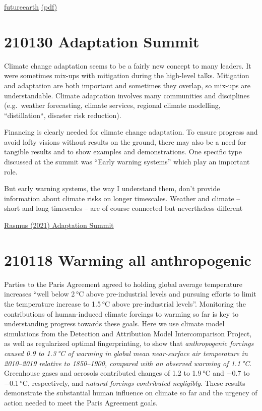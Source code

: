 \documentclass[
]{book}
\begin{document}
\href{https://10nics2020.futureearth.org/}{futureearth}
\href{pdf/10-new-insights-in-climate-science-2020.pdf}{(pdf)}

\hypertarget{adaptation-summit}{%
\section{210130 Adaptation Summit}\label{adaptation-summit}}

Climate change adaptation seems to be a fairly new concept to many leaders. It were sometimes mix-ups with mitigation during the high-level talks.
Mitigation and adaptation are both important and sometimes they overlap, so mix-ups are understandable.
Climate adaptation involves many communities and disciplines (e.g.~weather forecasting, climate services, regional climate modelling, ``distillation``, disaster risk reduction).

Financing is clearly needed for climate change adaptation. To ensure progress and avoid lofty visions without results on the ground, there may also be a need for tangible results and to show examples and demonstrations. One specific type discussed at the summit was ``Early warning systems'' which play an important role.

But early warning systems, the way I understand them, don't provide information about climate risks on longer timescales. Weather and climate -- short and long timescales -- are of course connected but nevertheless different

\href{http://www.realclimate.org/index.php/archives/2021/01/climate-adaptation-summit-2021/}{Rasmus (2021) Adaptation Summit}

\hypertarget{warming-all-anthropogenic}{%
\section{210118 Warming all anthropogenic}\label{warming-all-anthropogenic}}

Parties to the Paris Agreement agreed to holding global average temperature increases ``well below 2 °C above pre-industrial levels and pursuing efforts to limit the temperature increase to 1.5 °C above pre-industrial levels''. Monitoring the contributions of human-induced climate forcings to warming so far is key to understanding progress towards these goals. Here we use climate model simulations from the Detection and Attribution Model Intercomparison Project, as well as regularized optimal fingerprinting, to show that \emph{anthropogenic forcings caused 0.9 to 1.3 °C of warming in global mean near-surface air temperature in 2010--2019 relative to 1850--1900, compared with an observed warming of 1.1 °C}. Greenhouse gases and aerosols contributed changes of 1.2 to 1.9 °C and −0.7 to −0.1 °C, respectively, and \emph{natural forcings contributed negligibly}. These results demonstrate the substantial human influence on climate so far and the urgency of action needed to meet the Paris Agreement goals.
\end{document}
